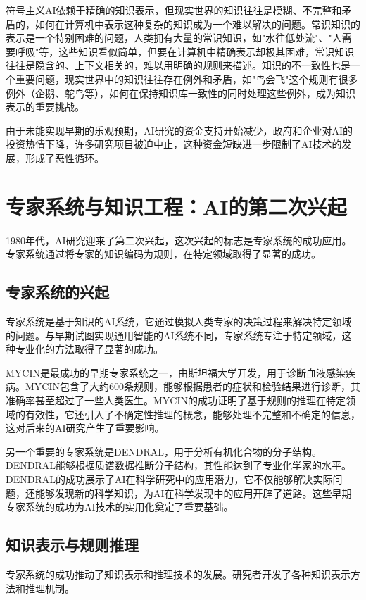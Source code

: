 符号主义AI依赖于精确的知识表示，但现实世界的知识往往是模糊、不完整和矛盾的，如何在计算机中表示这种复杂的知识成为一个难以解决的问题。常识知识的表示是一个特别困难的问题，人类拥有大量的常识知识，如"水往低处流"、"人需要呼吸"等，这些知识看似简单，但要在计算机中精确表示却极其困难，常识知识往往是隐含的、上下文相关的，难以用明确的规则来描述。知识的不一致性也是一个重要问题，现实世界中的知识往往存在例外和矛盾，如"鸟会飞"这个规则有很多例外（企鹅、鸵鸟等），如何在保持知识库一致性的同时处理这些例外，成为知识表示的重要挑战。

由于未能实现早期的乐观预期，AI研究的资金支持开始减少，政府和企业对AI的投资热情下降，许多研究项目被迫中止，这种资金短缺进一步限制了AI技术的发展，形成了恶性循环。

\section{专家系统与知识工程：AI的第二次兴起}

1980年代，AI研究迎来了第二次兴起，这次兴起的标志是专家系统的成功应用。专家系统通过将专家的知识编码为规则，在特定领域取得了显著的成功。

\subsection{专家系统的兴起}

专家系统是基于知识的AI系统，它通过模拟人类专家的决策过程来解决特定领域的问题。与早期试图实现通用智能的AI系统不同，专家系统专注于特定领域，这种专业化的方法取得了显著的成功。

MYCIN是最成功的早期专家系统之一，由斯坦福大学开发，用于诊断血液感染疾病。MYCIN包含了大约600条规则，能够根据患者的症状和检验结果进行诊断，其准确率甚至超过了一些人类医生。MYCIN的成功证明了基于规则的推理在特定领域的有效性，它还引入了不确定性推理的概念，能够处理不完整和不确定的信息，这对后来的AI研究产生了重要影响。

另一个重要的专家系统是DENDRAL，用于分析有机化合物的分子结构。DENDRAL能够根据质谱数据推断分子结构，其性能达到了专业化学家的水平。DENDRAL的成功展示了AI在科学研究中的应用潜力，它不仅能够解决实际问题，还能够发现新的科学知识，为AI在科学发现中的应用开辟了道路。这些早期专家系统的成功为AI技术的实用化奠定了重要基础。

\subsection{知识表示与规则推理}

专家系统的成功推动了知识表示和推理技术的发展。研究者开发了各种知识表示方法和推理机制。

